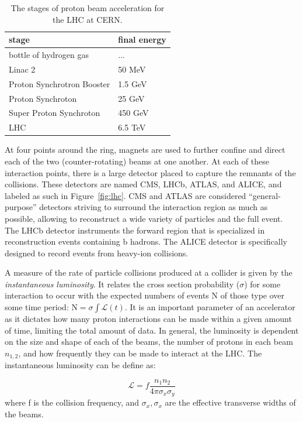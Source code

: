 \begin{table}
\centering
\caption{The stages of proton beam acceleration for the LHC at CERN.}
\label{tab:stages}
\begin{tabular}{ll}
\hline\hline
stage & final energy\\
\hline
bottle of hydrogen gas & ...\\
Linac 2 & 50 MeV\\
Proton Synchrotron Booster & 1.5 GeV\\
Proton Synchroton & 25 GeV\\
Super Proton Synchroton & 450 GeV\\
LHC & 6.5 TeV\\
\hline
\hline
\end{tabular}
\end{table}

At four points around the ring, magnets are used to further confine and direct each of the two (counter-rotating) beams at one another. At each of these interaction points, there is a large detector placed to capture the remnants of the collisions. These detectors are named CMS, LHCb, ATLAS, and ALICE, and labeled as such in Figure~\ref{fig:lhc}. CMS and ATLAS are considered ``general-purpose'' detectors striving to surround the interaction region as much as possible, allowing to reconstruct a wide variety of particles and the full event. The LHCb detector instruments the forward region that is specialized in reconstruction events containing b hadrons.  The ALICE detector is specifically designed to record events from heavy-ion collisions.

A measure of the rate of particle collisions produced at a collider is given by the \textit{instantaneous luminosity}. It relates the cross section probability ($\sigma$) for some interaction to occur with the expected numbers of events N of those type over some time period: $\textrm{N} = \sigma \int \mathcal{L}(t)$. It is an important parameter of an accelerator as it dictates how many proton interactions can be made within a given amount of time, limiting the total amount of data. In general, the luminosity is dependent on the size and shape of each of the beams, the number of protons in each beam $n_{1,2}$, and how frequently they can be made to interact at the LHC. The instantaneous luminosity can be define as:

\begin{equation}
\label{eq:lumi}
\mathcal{L} = f \frac{n_{1} n_{2}}  { 4 \pi \sigma_{x} \sigma_{y}}
\end{equation}
where f is the collision frequency, and $\sigma_{x}, \sigma_{x}$ are the effective transverse widths of the beams.

